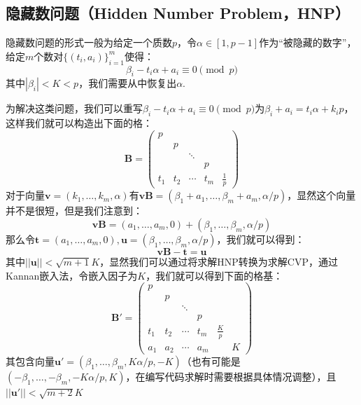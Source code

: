 \documentclass{book}
\numberwithin{equation}{subsubsection}
\begin{document}
\subsection{隐藏数问题（Hidden Number Problem，HNP）}
隐藏数问题的形式一般为给定一个质数$p$，令$\alpha\in[1,p-1]$作为“被隐藏的数字”，给定$m$个数对$\{(t_i,a_i)\}^{m}_{i=1}$使得：
\begin{equation}
    \beta_i-t_i\alpha+a_i\equiv0\pmod{p}
    \nonumber
\end{equation}
其中$|\beta_i|<K<p$，我们需要从中恢复出$\alpha$.\par
为解决这类问题，我们可以重写$\beta_i-t_i\alpha+a_i\equiv0\pmod{p}$为$\beta_i+a_i=t_i\alpha+k_ip$，这样我们就可以构造出下面的格：
\begin{equation}
    \pmb{B}=\left(\begin{matrix}
        p&&&&\\
        &p&&&\\
        &&\ddots&&\\
        &&&p&\\
        t_1&t_2&\cdots&t_m&\frac{1}{p}
    \end{matrix}\right)
    \nonumber
\end{equation}
对于向量$\pmb{v}=(k_1,\ldots,k_m,\alpha)$有$\pmb{v}\pmb{B}=(\beta_1+a_1,\ldots,\beta_m+a_m,\alpha/p)$，显然这个向量并不是很短，但是我们注意到：
\begin{equation}
    \pmb{v}\pmb{B}=(a_1,\ldots,a_m,0)+(\beta_1,\ldots,\beta_m,\alpha/p)
    \nonumber
\end{equation}
那么令$\pmb{t}=(a_1,\ldots,a_m,0),\pmb{u}=(\beta_1,\ldots,\beta_m,\alpha/p)$，我们就可以得到：
\begin{equation}
    \pmb{v}\pmb{B}-\pmb{t}=\pmb{u}
    \nonumber
\end{equation}
其中$||\pmb{u}||<\sqrt{m+1}K$，显然我们可以通过将求解HNP转换为求解CVP，通过Kannan嵌入法，令嵌入因子为$K$，我们就可以得到下面的格基：
\begin{equation}
    \pmb{B}'=\left(\begin{matrix}
        p&&&&&\\
        &p&&&&\\
        &&\ddots&&&\\
        &&&p&&\\
        t_1&t_2&\cdots&t_m&\frac{K}{p}&\\
        a_1&a_2&\cdots&a_m&&K
    \end{matrix}\right)
    \nonumber
\end{equation}
其包含向量$\pmb{u}'=(\beta_1,\ldots,\beta_m,K\alpha/p,-K)$（也有可能是$(-\beta_1,\ldots,-\beta_m,-K\alpha/p,K)$，在编写代码求解时需要根据具体情况调整），且$||\pmb{u}'||<\sqrt{m+2}K$
\end{document}
